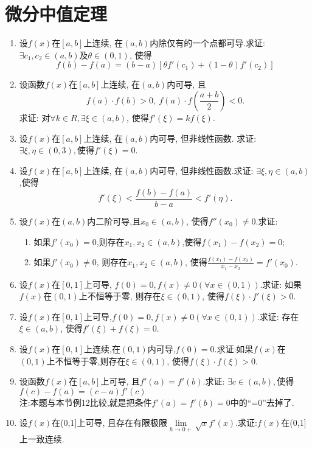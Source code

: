 \section{微分中值定理}
\begin{enumerate}
	\item 设$f(x)$在$[a,b]$上连续, 在$(a,b)$内除仅有的一个点都可导.求证: $\exists c_1,c_2\in(a,b)$及$\theta \in (0,1)$, 使得
	$$f(b)-f(a)=(b-a)[\theta f'(c_1)+(1-\theta)f'(c_2)]
	$$
	\item 设函数$f(x)$在$[a,b]$上连续, 在$(a,b)$内可导, 且$$
	f(a)\cdot f(b) > 0,\ f(a)\cdot f(\frac{a+b}{2})<0.$$
	求证: 对$\forall k\in R, \exists \xi\in (a,b)$, 使得$f'(\xi)=kf(\xi)$.
	\item 设$f(x)$在$[a,b]$上连续, 在$(a,b)$内可导, 但非线性函数. 求证: 
	$\exists \xi,\eta\in(0,3), $使得$f'(\xi)=0$.
	\item 设$f(x)$在$[a,b]$上连续, 在$(a,b)$内可导, 但非线性函数.求证: $\exists \xi,\eta\in (a,b)$,使得$$
	f'(\xi)<\frac{f(b)-f(a)}{b-a}<f'(\eta).$$
	\item 设$f(x)$在$(a,b)$内二阶可导,且$x_0\in (a,b)$, 使得$f''(x_0)\ne 0$.求证:
	\begin{enumerate}
		\item 如果$f'(x_0)=0$,则存在$x_1,x_2\in (a,b)$,使得${f(x_1)-f(x_2)}=0$;
		\item 如果$f'(x_0)\ne 0$, 则存在$x_1,x_2\in (a,b)$, 使得$\frac{f(x_1)-f(x_2)}{x_1-x_2}=f'(x_0)$.
	\end{enumerate}
	\item 设$f(x)$在$[0,1]$上可导, $f(0)=0, f(x)\ne 0(\forall x\in(0,1))$.求证: 如果$f(x)$在$(0,1)$上不恒等于零, 则存在$\xi \in (0,1)$, 使得$f(\xi)\cdot f'(\xi)>0$.
	\item 设$f(x)$在$[0,1]$上可导,$f(0)=0,f(x)\ne 0(\forall x\in (0,1))$.求证:
	存在$\xi\in(a,b)$, 使得$f'(\xi)+f(\xi)=0$.
	\item 设$f(x)$在$[0,1]$上连续,在$(0,1)$内可导,$f(0)=0$.求证:如果$f(x)$在$(0,1)$上不恒等于零,则存在$\xi \in (0,1)$, 使得$f(\xi)\cdot f(\xi)>0$.
	\item 设函数$f(x)$在$[a,b]$上可导, 且$f'(a)=f'(b)$.求证: $\exists c\in (a,b), $使得$f(c)-f(a)=(c-a)f'(c)$ \\
	注:\quad 本题与本节例12比较,就是把条件$f'(a)=f'(b)=0$中的“=0”去掉了.
	\item 设$f(x)$在(0,1]上可导, 且存在有限极限$\lim\limits_{h\rightarrow 0+}\sqrt{x}f'(x)$.求证:$f(x)$在(0,1]上一致连续.
\end{enumerate}

